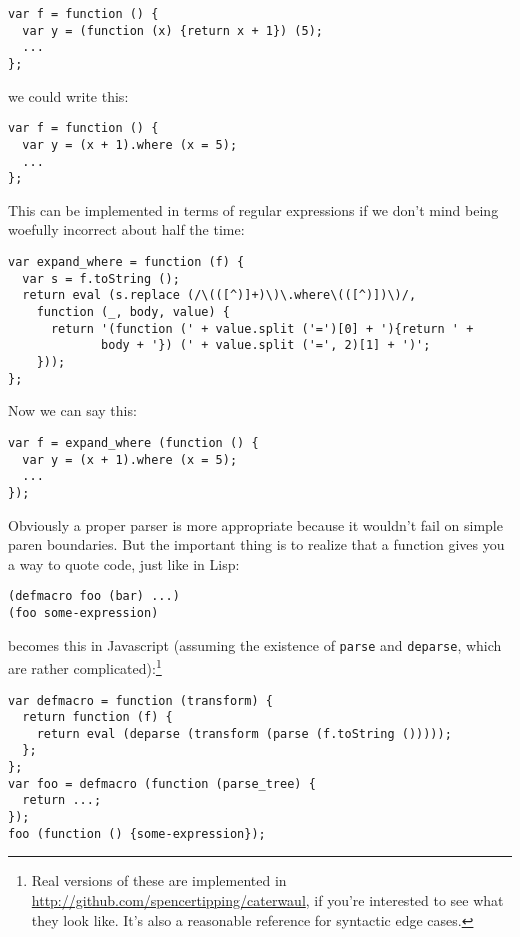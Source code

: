 \documentclass{article}
\begin{document}
\begin{verbatim}
var f = function () {
  var y = (function (x) {return x + 1}) (5);
  ...
};
\end{verbatim}

    \noindent we could write this:

\begin{verbatim}
var f = function () {
  var y = (x + 1).where (x = 5);
  ...
};
\end{verbatim}

    This can be implemented in terms of regular expressions if we don't mind being woefully incorrect about half the time:

\begin{verbatim}
var expand_where = function (f) {
  var s = f.toString ();
  return eval (s.replace (/\(([^)]+)\)\.where\(([^)])\)/,
    function (_, body, value) {
      return '(function (' + value.split ('=')[0] + '){return ' +
             body + '}) (' + value.split ('=', 2)[1] + ')';
    }));
};
\end{verbatim}

    Now we can say this:

\begin{verbatim}
var f = expand_where (function () {
  var y = (x + 1).where (x = 5);
  ...
});
\end{verbatim}

    Obviously a proper parser is more appropriate because it wouldn't fail on simple paren boundaries. But the important thing is to realize that a function gives you a way to quote code, just
    like in Lisp:

\begin{verbatim}
(defmacro foo (bar) ...)
(foo some-expression)
\end{verbatim}

    \noindent becomes this in Javascript (assuming the existence of \verb|parse| and \verb|deparse|, which are rather complicated):\footnote{Real versions of these are implemented in
    \url{http://github.com/spencertipping/caterwaul}, if you're interested to see what they look like. It's also a reasonable reference for syntactic edge cases.}

\begin{verbatim}
var defmacro = function (transform) {
  return function (f) {
    return eval (deparse (transform (parse (f.toString ()))));
  };
};
var foo = defmacro (function (parse_tree) {
  return ...;
});
foo (function () {some-expression});
\end{verbatim}
\end{document}
